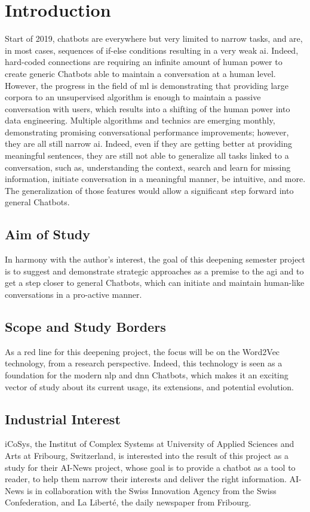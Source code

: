 \chapter{Introduction}
\label{chap:introduction}

Start of 2019, chatbots are everywhere but very limited to narrow tasks, and are, in most cases, sequences of if-else conditions resulting in a very weak \gls{ai}. Indeed, hard-coded connections are requiring an infinite amount of human power to create generic Chatbots able to maintain a conversation at a human level. However, the progress in the field of \gls{ml} is demonstrating that providing large corpora to an unsupervised algorithm is enough to maintain a passive conversation with users, which results into a shifting of the human power into data engineering. Multiple algorithms and technics are emerging monthly, demonstrating promising conversational performance improvements; however, they are all still narrow \acrshort{ai}. Indeed, even if they are getting better at providing meaningful sentences, they are still not able to generalize all tasks linked to a conversation, such as, understanding the context, search and learn for missing information, initiate conversation in a meaningful manner, be intuitive, and more. The generalization of those features would allow a significant step forward into general Chatbots.

\section{Aim of Study}
In harmony with the author's interest, the goal of this deepening semester project is to suggest and demonstrate strategic approaches as a premise to the \acrshort{agi} and to get a step closer to general Chatbots, which can initiate and maintain human-like conversations in a pro-active manner.

\section{Scope and Study Borders}
As a red line for this deepening project, the focus will be on the Word2Vec technology, from a research perspective. Indeed, this technology is seen as a foundation for the modern \acrshort{nlp} and \acrshort{dnn} Chatbots, which makes it an exciting vector of study about its current usage, its extensions, and potential evolution. 

\section{Industrial Interest}
iCoSys, the Institut of Complex Systems at University of Applied Sciences and Arts at Fribourg, Switzerland, is interested into the result of this project as a study for their AI-News project, whose goal is to provide a chatbot as a tool to reader, to help them narrow their interests and deliver the right information. AI-News is in collaboration with the Swiss Innovation Agency from the Swiss Confederation, and La Liberté, the daily newspaper from Fribourg. 